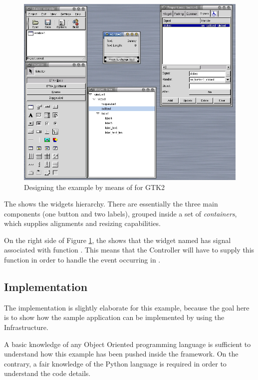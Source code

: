 \begin{figure}[here]
\begin{center}
\includegraphics[width=12cm]{figs/png/example_glade}
\caption{\label{GL:f}Designing the example by means of \glade for GTK2}
\end{center}
\end{figure}

The  shows the widgets hierarchy. There are
essentially the three main components (one button and two labels),
grouped inside a set of \emph{containers}, which supplies alignments and
resizing capabilities.

On the right side of Figure \ref{GL:f}, the 
shows that the widget named  has signal
 associated with function
. This means that the Controller will
have to supply this function in order to handle the 
event occurring in .

\subsection{Implementation}
The implementation is slightly elaborate for this example, because the
goal here is to show how the sample application can be implemented by
using the \mvco Infrastructure.

A basic knowledge of any Object Oriented programming language is
sufficient to understand how this example has been pushed inside the
\mvco framework. On the contrary, a fair knowledge of the Python
language is required in order to understand the code details.


